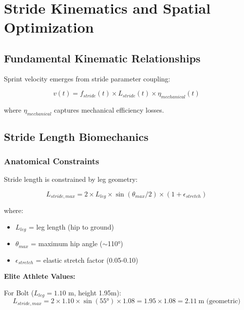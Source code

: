 \section{Stride Kinematics and Spatial Optimization}

\subsection{Fundamental Kinematic Relationships}

Sprint velocity emerges from stride parameter coupling:

\begin{equation}
v(t) = f_{stride}(t) \times L_{stride}(t) \times \eta_{mechanical}(t)
\label{eq:velocity_decomposition}
\end{equation}

where $\eta_{mechanical}$ captures mechanical efficiency losses.

\subsection{Stride Length Biomechanics}

\subsubsection{Anatomical Constraints}

Stride length is constrained by leg geometry:

\begin{equation}
L_{stride,max} = 2 \times L_{leg} \times \sin(\theta_{max}/2) \times (1 + \epsilon_{stretch})
\label{eq:stride_length_anatomical}
\end{equation}

where:
\begin{itemize}
\item $L_{leg}$ = leg length (hip to ground)
\item $\theta_{max}$ = maximum hip angle ($\sim$110°)
\item $\epsilon_{stretch}$ = elastic stretch factor (0.05-0.10)
\end{itemize}

\textbf{Elite Athlete Values:}

For Bolt ($L_{leg} = 1.10$ m, height 1.95m):
\begin{equation}
L_{stride,max} = 2 \times 1.10 \times \sin(55°) \times 1.08 = 1.95 \times 1.08 = 2.11~\text{m (geometric)}
\label{eq:bolt_stride_geometric}
\end{equation}

